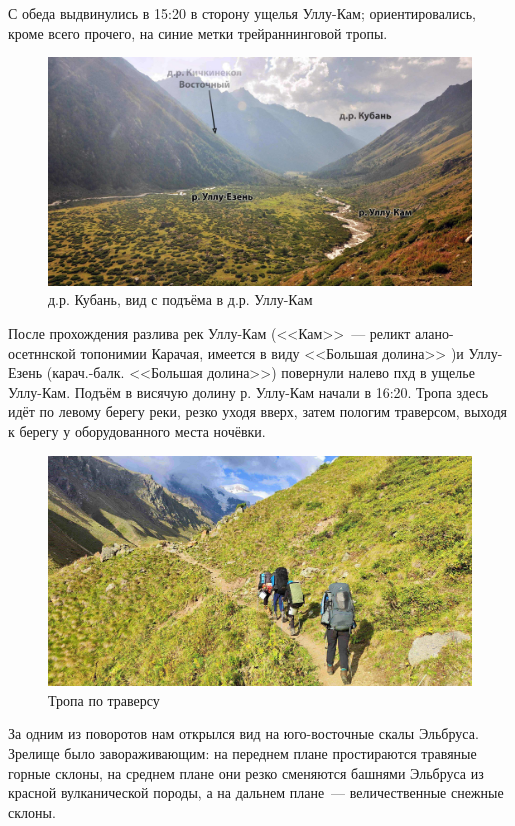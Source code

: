 С обеда выдвинулись в 15:20 в сторону ущелья Уллу-Кам; ориентировались, кроме всего прочего, на синие метки трейраннинговой тропы.

\begin{figure}[h!]
	\centering
	\includegraphics[width=0.7\linewidth]{../pics/DSC_0464 2.JPG}
	\caption{д.р. Кубань, вид с подъёма в д.р. Уллу-Кам}
	\label{fig:DSC_0464 2.JPG}
\end{figure}

После прохождения разлива рек Уллу-Кам (<<Кам>>~--- реликт алано-осетннской топонимии Карачая, имеется в виду <<Большая долина>> \cite{proza})и Уллу-Езень (карач.-балк. <<Большая долина>>) повернули налево пхд в ущелье Уллу-Кам. Подъём в висячую долину р. Уллу-Кам начали в 16:20. Тропа здесь идёт по левому берегу реки, резко уходя вверх, затем пологим траверсом, выходя к берегу у оборудованного места ночёвки.


\begin{figure}[h!]
	\centering
	\includegraphics[width=0.7\linewidth]{../pics/IMG_20240829_170756.jpg}
	\caption{Тропа по траверсу}
	\label{fig:IMG_20240829_170756.jpg}
\end{figure}

За одним из поворотов нам открылся вид на юго-восточные скалы Эльбруса. Зрелище было завораживающим: на переднем плане простираются травяные горные склоны, на среднем плане они резко сменяются башнями Эльбруса из красной вулканической породы, а на дальнем плане~--- величественные снежные склоны.

